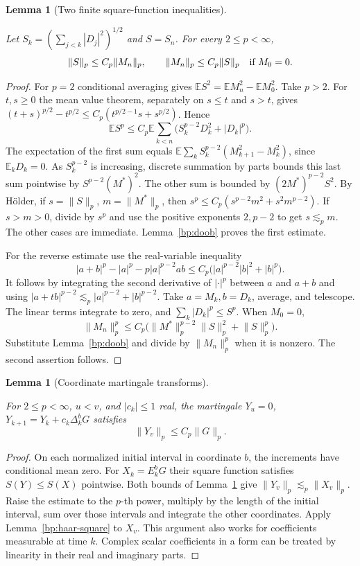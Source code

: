 \documentclass[11pt,letterpaper]{article}
\newtheorem{lemma}[theorem]{Lemma}
\theoremstyle{definition}
\newcommand{\E}{\mathbb E}
\newcommand{\norm}[1]{\lVert#1\rVert}
\providecommand{\lean}[1]{}
\providecommand{\uses}[1]{}
\begin{document}
\begin{lemma}[Two finite square-function inequalities]\label{bp:mart-square}
\lean{TwistedParaproduct.martSquare}
Let \(S_k=(\sum_{j<k}|D_j|^2)^{1/2}\) and \(S=S_n\). For every
\(2\le p<\infty\),
\[
       \norm{S}_p\le C_p\norm{M_n}_p,\qquad
       \norm{M_n}_p\le C_p\norm{S}_p \quad\hbox{if }M_0=0 .
\]
\end{lemma}
\begin{proof}
\uses{bp:doob}
For \(p=2\) conditional averaging gives
\(\E S^2=\E M_n^2-\E M_0^2\). Take \(p>2\). For \(t,s\ge0\)
the mean value theorem, separately on \(s\le t\) and \(s>t\), gives
\((t+s)^{p/2}-t^{p/2}\le C_p(t^{p/2-1}s+s^{p/2})\).
Hence
\[
 \E S^p\le C_p \E\sum_{k<n}
       \big(S_k^{p-2}D_k^2+|D_k|^p\big).
\]
The expectation of the first sum equals
\(\E\sum_k S_k^{p-2}(M_{k+1}^2-M_k^2)\), since
\(\E_kD_k=0\). As \(S_k^{p-2}\) is increasing, discrete summation
by parts bounds this last sum pointwise by \(S^{p-2}(M^*)^2\).
The other sum is bounded by \((2M^*)^{p-2}S^2\). By H\"older,
if \(s=\norm{S}_p\), \(m=\norm{M^*}_p\), then
\(s^p\le C_p(s^{p-2}m^2+s^2m^{p-2})\). If \(s>m>0\), divide
by \(s^p\) and use the positive exponents \(2,p-2\) to get
\(s\lesssim_p m\). The other cases are immediate. Lemma~\ref{bp:doob}
proves the first estimate.

For the reverse estimate use the real-variable inequality
\[
 |a+b|^p-|a|^p-p|a|^{p-2}ab
       \le C_p\bigl(|a|^{p-2}|b|^2+|b|^p\bigr).
\]
It follows by integrating the second derivative of \(|\cdot|^p\)
between \(a\) and \(a+b\) and using
\(|a+tb|^{p-2}\lesssim_p |a|^{p-2}+|b|^{p-2}\).
Take \(a=M_k,b=D_k\), average, and telescope. The linear terms
integrate to zero, and \(\sum_k|D_k|^p\le S^p\). When \(M_0=0\),
\[
 \norm{M_n}_p^p\le C_p\big(\norm{M^*}_p^{p-2}\norm{S}_p^2+
                                     \norm{S}_p^p\big).
\]
Substitute Lemma~\ref{bp:doob} and divide by \(\norm{M_n}_p^p\)
when it is nonzero. The second assertion follows.
\end{proof}

\begin{lemma}[Coordinate martingale transforms]\label{bp:mart-transform}
\lean{TwistedParaproduct.martTransform}
For \(2\le p<\infty\), \(u<v\), and \(|c_k|\le1\) real, the
martingale \(Y_u=0\), \(Y_{k+1}=Y_k+c_k\Delta_k^b G\) satisfies
\[
                   \norm{Y_v}_p\le C_p\norm{G}_p .
\]
\end{lemma}
\begin{proof}
\uses{bp:mart-square,bp:haar-square}
On each normalized initial interval in coordinate \(b\), the increments
have conditional mean zero. For \(X_k=E_k^b G\) their square function
satisfies \(S(Y)\le S(X)\) pointwise. Both bounds of
Lemma~\ref{bp:mart-square} give
\(\norm{Y_v}_p\lesssim_p\norm{X_v}_p\). Raise the estimate to
the \(p\)-th power, multiply by the length of the initial interval,
sum over those intervals and integrate the other coordinates.
Apply Lemma~\ref{bp:haar-square} to \(X_v\). This argument also works
for coefficients measurable at time \(k\). Complex scalar coefficients
in a form can be treated by linearity in their real and imaginary parts.
\end{proof}
\end{document}
